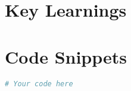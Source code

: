 \documentclass{article}
\begin{document}
\section{Key Learnings}

\section{Code Snippets}
\begin{lstlisting}[language=Python]
# Your code here
\end{lstlisting}
\end{document}
